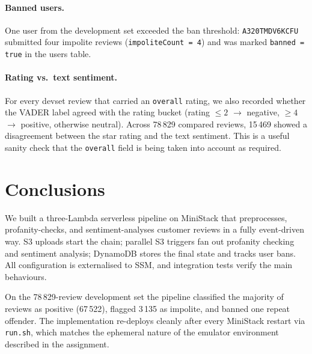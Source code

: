 \documentclass[11pt,a4paper]{article}
\begin{document}
\paragraph{Banned users.}  One user from the development set exceeded the
ban threshold: \texttt{A320TMDV6KCFU} submitted four impolite reviews
(\texttt{impoliteCount = 4}) and was marked \texttt{banned = true} in
the users table.

\paragraph{Rating vs.\ text sentiment.}  For every devset review that
carried an \texttt{overall} rating, we also recorded whether the VADER
label agreed with the rating bucket (rating $\leq 2$ $\rightarrow$
negative, $\geq 4$ $\rightarrow$ positive, otherwise neutral). Across
78\,829 compared reviews, 15\,469 showed a disagreement between the
star rating and the text sentiment. This is a useful sanity check that the
\texttt{overall} field is being taken into account as required.

\section{Conclusions}

We built a three-Lambda serverless pipeline on MiniStack that
preprocesses, profanity-checks, and sentiment-analyses customer reviews
in a fully event-driven way. S3 uploads start the chain; parallel S3
triggers fan out profanity checking and sentiment analysis; DynamoDB
stores the final state and tracks user bans. All configuration is
externalised to SSM, and integration tests verify the main behaviours.

On the 78\,829-review development set the pipeline classified the
majority of reviews as positive (67\,522), flagged 3\,135 as impolite,
and banned one repeat offender. The implementation re-deploys cleanly
after every MiniStack restart via \texttt{run.sh}, which matches the
ephemeral nature of the emulator environment described in the assignment.
\end{document}

